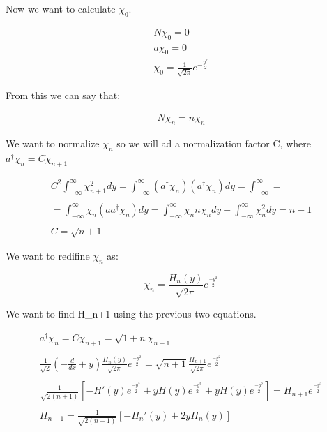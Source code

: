 Now we want to calculate $\chi_0$.

\begin{equation}
  \begin{array}{c}
    N\chi_0 = 0
    \\
    a\chi_0 = 0
    \\
    \chi_0 = \frac{1}{\sqrt{2\pi}}e^{-\frac{y^2}{2}}
  \end{array}
\end{equation}

From this we can say that:

\begin{equation}
  \begin{array}{c}
    N\chi_n = n \chi_n
  \end{array}
\end{equation}

We want to normalize $\chi_n$ so we will ad a normalization factor C, where $a^\dagger\chi_n=C\chi_{n+1}$

\begin{equation}
  \begin{array}{c}
    C^2 \int_{-\infty}^{\infty} \chi^2_{n+1} dy = \int_{-\infty}^{\infty} (a^\dagger\chi_n)(a^\dagger\chi_n)dy = \int_{-\infty}^{\infty} =
    \\

    \\
    = \int_{-\infty}^{\infty}\chi_n(aa^\dagger\chi_n)dy=\int_{-\infty}^{\infty}\chi_n n\chi_n dy + \int_{-\infty}^{\infty}\chi_n^2dy= n+1
    \\

    \\
    C = \sqrt{n+1}
  \end{array}
\end{equation}

We want to redifine $\chi_n$ as:

\begin{equation}
  \chi_n = \frac{H_n(y)}{\sqrt{2\pi}}e^{\frac{-y^2}{2}}
\end{equation}

We want to find H_{n+1} using the previous two equations.

\begin{equation}
  \begin{array}{c}
    a^\dagger \chi_n = C \chi_{n+1} = \sqrt{1+n} \chi_{n+1}
    \\

    \\
    \frac{1}{\sqrt{2}}\left(-\frac{d}{dx}+y\right)\frac{H_n(y)}{\sqrt{2\pi}}e^{\frac{-y^2}{2}} = \sqrt{n+1} \frac{H_{n+1}}{\sqrt{2\pi}}e^{\frac{-y^2}{2}}
    \\

    \\
    \frac{1}{\sqrt{2(n+1)}}\left[-H'(y)e^{\frac{-y^2}{2}}+y H(y)e^\frac{-y^2}{2}+y H(y)e^\frac{-y^2}{2}\right]= H_{n+1} e^\frac{-y^2}{2}
    \\

    \\
    H_{n+1} = \frac{1}{\sqrt{2(n+1)}}\left[-H_n'(y)+2 y H_n(y)\right]
  \end{array}
\end{equation}

